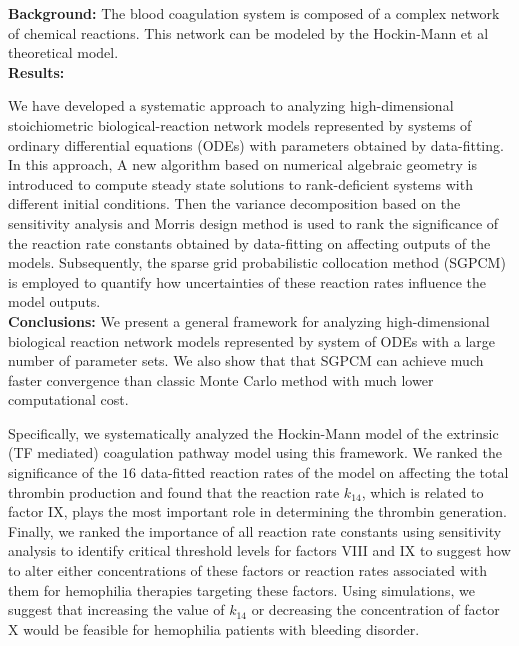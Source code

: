 {\bf Background:} The blood coagulation system is composed of a
complex network of chemical reactions. This network can be modeled
by the Hockin-Mann et al theoretical model.
\\{\bf Results:}

We have developed a systematic approach to analyzing high-dimensional stoichiometric
biological-reaction network models represented by systems of ordinary differential equations (ODEs) with parameters obtained by data-fitting.
In this approach, A new algorithm based on numerical algebraic
geometry  is introduced to compute steady state solutions to rank-deficient
systems with different initial
conditions.  %
Then the variance decomposition based on the sensitivity
analysis and Morris design method is used to rank the significance of the reaction rate constants obtained by data-fitting on affecting outputs of the models.
Subsequently, the sparse grid
probabilistic collocation method (SGPCM) is employed to quantify how
uncertainties of these reaction rates influence the model outputs.
\\{\bf Conclusions:} %
We present a general framework for analyzing high-dimensional
biological reaction network models represented by system of ODEs with a large number of parameter sets.
We also show that that SGPCM can achieve much faster convergence than classic Monte Carlo
method with much lower computational cost.

Specifically, we systematically analyzed the Hockin-Mann model of the extrinsic
(TF mediated) coagulation pathway model using this framework.
We ranked the significance of the $16$ data-fitted reaction rates of the model on affecting the total thrombin production and found that the reaction rate $k_{14}$, which is related to
factor IX, plays the  most important role in determining the thrombin generation.
Finally, we ranked the
importance of all reaction rate constants using sensitivity
analysis to identify critical threshold levels for factors VIII and
IX to  suggest how to alter either concentrations of these factors or
 reaction rates associated with them for hemophilia therapies targeting these
 factors. Using simulations, we suggest that increasing the value of
$k_{14}$ or decreasing the concentration of factor X would be feasible for hemophilia patients with bleeding disorder.
